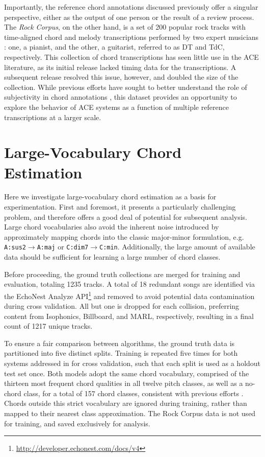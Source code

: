 \documentclass{article}
\begin{document}
Importantly, the reference chord annotations discussed previously offer a  singular perspective, either as the output of one person or the result of a review process.
The \emph{Rock Corpus}, on the other hand, is a set of 200 popular rock tracks with time-aligned chord and melody transcriptions performed by two expert musicians \cite{deClercq2011Corpus}:
one, a pianist, and the other, a guitarist, referred to as DT and TdC, respectively.
This collection of chord transcriptions has seen little use in the ACE literature, as its initial release lacked timing data for the transcriptions.
A subsequent release resolved this issue, however, and doubled the size of the collection.
While previous efforts have sought to better understand the role of subjectivity in chord annotations \cite{Ni2013Understanding}, this dataset provides an opportunity to explore the behavior of ACE systems as a function of multiple reference transcriptions at a larger scale.


\section{Large-Vocabulary Chord Estimation}
\label{sec:experiment}

Here we investigate large-vocabulary chord estimation as a basis for experimentation. %
First and foremost, it presents a particularly challenging problem, and therefore offers a good deal of potential for subsequent analysis.
Large chord vocabularies also avoid the inherent noise introduced by approximately mapping chords into the classic major-minor formulation, e.g. \texttt{A:sus2}$\to$\texttt{A:maj} or \texttt{C:dim7}$\to$\texttt{C:min}.
Additionally, the large amount of available data should be sufficient for learning a large number of chord classes.

Before proceeding, the ground truth collections are merged for training and evaluation, totaling 1235 tracks.
A total of 18 redundant songs are identified via the EchoNest Analyze API\footnote{\url{http://developer.echonest.com/docs/v4}} and removed to avoid potential data contamination during cross validation.
All but one is dropped for each collision, preferring content from Isophonics, Billboard, and MARL, respectively, resulting in a final count of 1217 unique tracks.

To ensure a fair comparison between algorithms, the ground truth data is partitioned into five distinct splits.
Training is repeated five times for both systems addressed in  for cross validation, such that each split is used as a holdout test set once.
Both models adopt the same chord vocabulary, comprised of the thirteen most frequent chord qualities in all twelve pitch classes, as well as a no-chord class, for a total of 157 chord classes, consistent with previous efforts \cite{Cho2014Improved}.
Chords outside this strict vocabulary are ignored during training, rather than mapped to their nearest class approximation.
The Rock Corpus data is not used for training, and saved exclusively for analysis.
\end{document}
